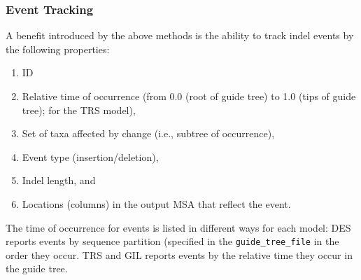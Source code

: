 \documentclass[10pt]{article}
\begin{document}
 \subsubsection*{Event Tracking}

 A benefit introduced by the above methods is the ability to track indel events by the following properties:
 \begin{enumerate}
 \item ID
 \item Relative time of occurrence (from 0.0 (root of guide tree) to 1.0 (tips of guide tree); for the TRS model), 
 \item Set of taxa affected by change (i.e., subtree of occurrence), 
 \item Event type (insertion/deletion), 
 \item Indel length, and 
 \item Locations (columns) in the output MSA that reflect the event. 
 \end{enumerate}
 
 The time of occurrence for events is listed in different ways for each model: DES reports events by sequence partition (specified in the {\tt guide\_tree\_file} in the order they occur. TRS and GIL reports events by the relative time they occur in the guide tree. 
 
 
\end{document}
